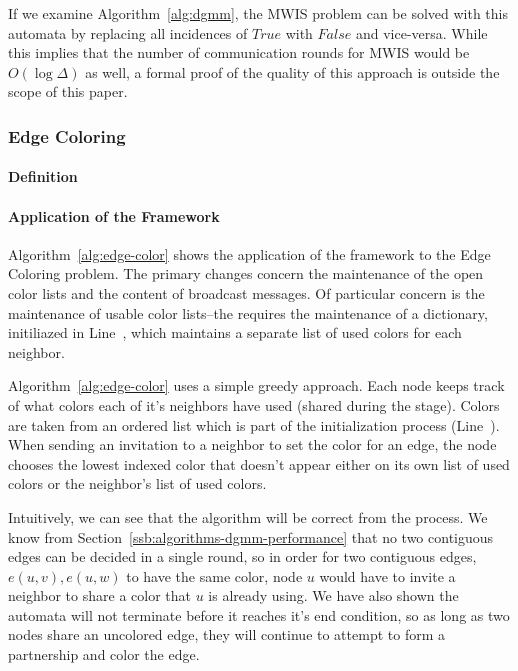 \documentclass[article, 10pt, letter]{IEEEtran}
\begin{document}
If we examine Algorithm~\ref{alg:dgmm}, the MWIS problem can be solved with this automata by replacing all incidences of $True$ with $False$ and vice-versa. While this implies that the number of communication rounds for MWIS would be $O(\log \Delta)$ as well, a formal proof of the quality of this approach is outside the scope of this paper.

\subsubsection{Edge Coloring}
\paragraph{Definition}

\paragraph{Application of the Framework}
\label{par:apply-edge-color}

Algorithm~\ref{alg:edge-color} shows the application of the framework to the Edge Coloring problem. The primary changes concern the maintenance of the open color lists and the content of broadcast messages. Of particular concern is the maintenance of usable color lists--the requires the maintenance of a dictionary, initiliazed in Line~, which maintains a separate list of used colors for each neighbor.




Algorithm~\ref{alg:edge-color} uses a simple greedy approach. Each node keeps track of what colors each of it's neighbors have used (shared during the \cEd stage). Colors are taken from an ordered list which is part of the initialization process (Line~). When sending an invitation to a neighbor to set the color for an edge, the node chooses the lowest indexed color that doesn't appear either on its own list of used colors or the neighbor's list of used colors.

Intuitively, we can see that the algorithm will be correct from the process. We know from Section~\ref{ssb:algorithms-dgmm-performance} that no two contiguous edges can be decided in a single round, so in order for two contiguous edges, $e(u,v), e(u,w)$ to have the same color, node $u$ would have to invite a neighbor to share a color that $u$ is already using. We have also shown the automata will not terminate before it reaches it's end condition, so as long as two nodes share an uncolored edge, they will continue to attempt to form a partnership and color the edge. 
\end{document}
